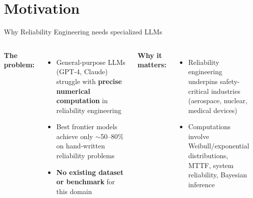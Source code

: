 \documentclass[aspectratio=169,10pt]{beamer}
\begin{document}
\section{Motivation}
\begin{frame}{Why Reliability Engineering needs specialized LLMs}
\begin{columns}[T]
\textbf{The problem:}
\begin{itemize}
  \item General-purpose LLMs (GPT-4, Claude) struggle with \textbf{precise numerical computation} in reliability engineering
  \item Best frontier models achieve only $\sim$50--80\% on hand-written reliability problems
  \item \textbf{No existing dataset or benchmark} for this domain
\end{itemize}

\vspace{0.5em}
\textbf{Why it matters:}
\begin{itemize}
  \item Reliability engineering underpins safety-critical industries (aerospace, nuclear, medical devices)
  \item Computations involve Weibull/exponential distributions, MTTF, system reliability, Bayesian inference
\end{itemize}

\centering
{}
\end{columns}
\end{frame}
\end{document}
